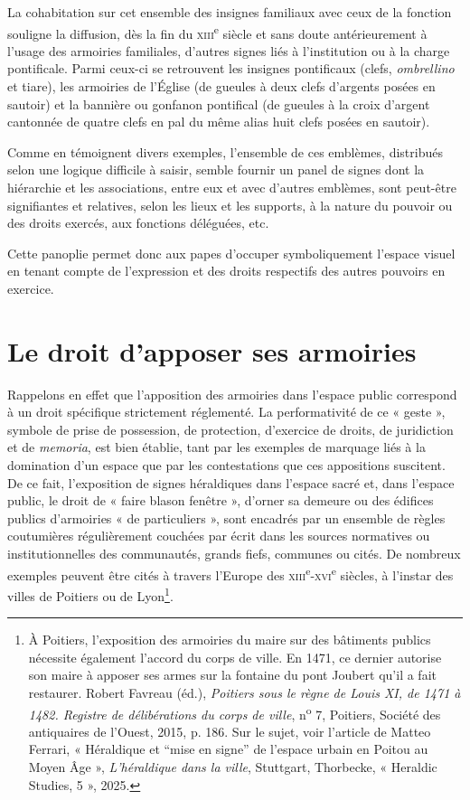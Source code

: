 \documentclass[12pt,twoside,openany]{book}
\begin{document}
La cohabitation sur cet ensemble des insignes familiaux avec ceux de la fonction souligne la diffusion, dès la fin du \textsc{xiii}\textsuperscript{e} siècle et sans doute antérieurement à l’usage des armoiries familiales, d’autres signes liés à l’institution ou à la charge pontificale. Parmi ceux-ci se retrouvent les insignes pontificaux (clefs, \textit{ombrellino} et tiare), les armoiries de l’Église (de gueules à deux clefs d’argents posées en sautoir) et la bannière ou gonfanon pontifical (de gueules à la croix d’argent cantonnée de quatre clefs en pal du même alias huit clefs posées en sautoir).

Comme en témoignent divers exemples, l’ensemble de ces emblèmes, distribués selon une logique difficile à saisir, semble fournir un panel de signes dont la hiérarchie et les associations, entre eux et avec d’autres emblèmes, sont peut-être signifiantes et relatives, selon les lieux et les supports, à la nature du pouvoir ou des droits exercés, aux fonctions déléguées, etc.

Cette panoplie permet donc aux papes d’occuper symboliquement l’espace visuel en tenant compte de l’expression et des droits respectifs des autres pouvoirs en exercice.

\section{Le droit d’apposer ses armoiries}

Rappelons en effet que l’apposition des armoiries dans l’espace public correspond à un droit spécifique strictement réglementé. La performativité de ce « geste », symbole de prise de possession, de protection, d’exercice de droits, de juridiction et de \textit{memoria}, est bien établie, tant par les exemples de marquage liés à la domination d’un espace que par les contestations que ces appositions suscitent. De ce fait, l’exposition de signes héraldiques dans l’espace sacré et, dans l’espace public, le droit de « faire blason fenêtre », d’orner sa demeure ou des édifices publics d’armoiries « de particuliers », sont encadrés par un ensemble de règles coutumières régulièrement couchées par écrit dans les sources normatives ou institutionnelles des communautés, grands fiefs, communes ou cités. De nombreux exemples peuvent être cités à travers l’Europe des \textsc{xiii}\textsuperscript{e}-\textsc{xvi}\textsuperscript{e} siècles, à l’instar des villes de Poitiers ou de Lyon\footnote{À Poitiers, l’exposition des armoiries du maire sur des bâtiments publics nécessite également l’accord du corps de ville. En 1471, ce dernier autorise son maire à apposer ses armes sur la fontaine du pont Joubert qu’il a fait restaurer. Robert Favreau (éd.), \textit{Poitiers sous le règne de Louis XI, de 1471 à 1482. Registre de délibérations du corps de ville}, n\textsuperscript{o} 7, Poitiers, Société des antiquaires de l’Ouest, 2015, p. 186. Sur le sujet, voir l’article de Matteo Ferrari, « Héraldique et “mise en signe” de l’espace urbain en Poitou au Moyen Âge », \textit{L’héraldique dans la ville}, Stuttgart, Thorbecke, « Heraldic Studies, 5 », 2025.}.
\end{document}
